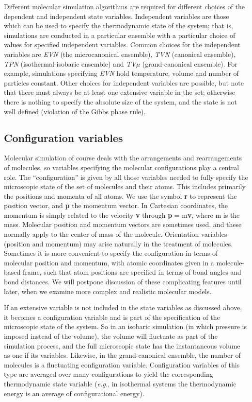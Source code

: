 \documentclass[9pt,bestpractices]{molsim}
\begin{document}
Different molecular simulation algorithms are required for different
choices of the dependent and independent state variables. 
Independent variables are those which can be used to specify the thermodynamic state of the system; that is, simulations are conducted in a particular ensemble with a particular choice of values for specified independent variables.
Common choices
for the independent variables are \emph{EVN} (the microcanonical ensemble), \emph{TVN}
(canonical ensemble), \emph{TPN} (isothermal-isobaric ensemble) and \emph{TV$\mu$}
(grand-canonical ensemble).
For example, simulations specifying \emph{EVN} hold temperature, volume and number of particles constant.
Other choices for independent variables are possible, but note that
there must always be at least one extensive variable in the set;
otherwise there is nothing to specify the absolute size of the system,
and the state is not well defined (violation of the Gibbs phase rule).

\subsection{Configuration variables}\label{configuration-variables}

Molecular simulation of course deals with the arrangements and
rearrangements of molecules, so variables specifying the molecular
configurations play a central role. The ``configuration'' is given by
all those variables needed to fully specify the microscopic state of the
set of molecules and their atoms. This includes primarily the positions
and momenta of all atoms. We use the symbol \textbf{r} to represent the
position vector, and \textbf{p} the momentum vector. In Cartesian
coordinates, the momentum is simply related to the velocity \textbf{v}
through \textbf{p} = m\textbf{v}, where m is the mass. Molecular
position and momentum vectors are sometimes used, and these normally
apply to the center of mass of the molecule. Orientation variables
(position and momentum) may arise naturally in the treatment of
molecules. Sometimes it is more convenient to specify the configuration
in terms of molecular position and momentum, with atomic coordinates
given in a molecule-based frame, such that atom positions are specified
in terms of bond angles and bond distances. We will postpone discussion
of these complicating features until later, when we examine more complex
and realistic molecular models.

If an extensive variable is not included in the state variables as
discussed above, it becomes a configuration variable and is part of the specification of the microscopic state of the system.
So in an isobaric
simulation (in which pressure is imposed instead of the volume), the
volume will fluctuate as part of the simulation process, and the full
microscopic state has the instantaneous volume as one if its variables.
Likewise, in the grand-canonical ensemble, the number of molecules is a
fluctuating configuration variable. Configuration variables of this type
are averaged over many configurations to yield the corresponding
thermodynamic state variable (\emph{e.g.}, in isothermal systems the
thermodynamic energy is an average of configurational energy).
\end{document}
